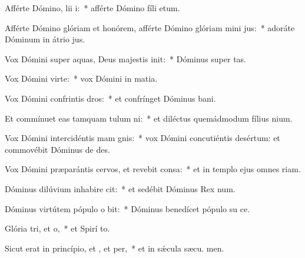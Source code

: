 \item Afférte Dómino, lii i:~* afférte Dómino fíli etum.
\item Afférte Dómino glóriam et honórem, afférte Dómino glóriam mini jus:~* adoráte Dóminum in átrio  jus.
\item Vox Dómini super aquas, Deus majestis init:~* Dóminus super  tas.
\item Vox Dómini  virte:~* vox Dómini in matia.
\item Vox Dómini confrintis dros:~* et confrínget Dóminus  bani.
\item Et commínuet eas tamquam tulum ni:~* et diléctus quemádmodum fílius nium.
\item Vox Dómini intercidéntis mam gnis:~* vox Dómini concutiéntis desértum: et commovébit Dóminus de des.
\item Vox Dómini præparántis cervos, et revebit consa:~* et in templo ejus omnes  riam.
\item Dóminus dilúvium inhabire cit:~* et sedébit Dóminus Rex  num.
\item Dóminus virtútem pópulo o bit:~* Dóminus benedícet pópulo su  ce.
\item Glória tri, et o,~* et Spirí to.
\item Sicut erat in princípio, et , et per,~* et in sǽcula sæcu. men.

